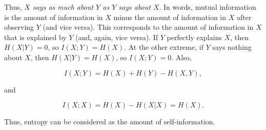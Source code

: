 \noindent Thus, \textit{$X$ says as much about $Y$ as $Y$ says about $X$}. In words, mutual information is the amount of information in $X$ minus the amount of information in $X$ after observing $Y$ (and vice versa). This corresponds to the amount of information in $X$ that is explained by $Y$ (and, again, vice versa). If $Y$ perfectly explains $X$, then $H(X | Y) = 0$, so $I(X; Y) = H(X)$. At the other extreme, if $Y$ says nothing about $X$, then $H(X | Y) = H(X)$, so $I(X; Y) = 0$. Also, 

\begin{equation}
	I(X; Y) = H(X) + H(Y) - H(X, Y),
\end{equation}

\noindent and

\begin{equation}
	I(X; X) = H(X) - H(X | X) = H(X).
\end{equation}

\noindent Thus, entropy can be considered as the amount of self-information.
















